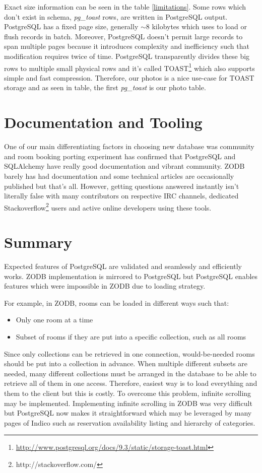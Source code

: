 Exact size information can be seen in the table \ref{limitations}. Some rows which don't exist in schema, \textit{pg\_toast} rows, are written in PostgreSQL output. PostgreSQL has a fixed page size, generally $\sim$8 kilobytes which uses to load or flush records in batch. Moreover, PostgreSQL doesn't permit large records to span multiple pages because it introduces complexity and inefficiency such that modification requires twice of time. PostgreSQL transparently divides these big rows to multiple small physical rows and it's called TOAST\footnote{\url{http://www.postgresql.org/docs/9.3/static/storage-toast.html}} which also supports simple and fast compression. Therefore, our photos is a nice use-case for TOAST storage and as seen in table, the first \textit{pg\_toast} is our photo table.

\section{Documentation and Tooling}

One of our main differentiating factors in choosing new database was community and room booking porting experiment has confirmed that PostgreSQL and SQLAlchemy have really good documentation and vibrant community. ZODB barely has had documentation and some technical articles are occasionally published but that's all. However, getting questions answered instantly isn't literally false with many contributors on respective IRC channels, dedicated Stackoverflow\footnote{http://stackoverflow.com/} users and active online developers using these tools.

\section{Summary}

Expected features of PostgreSQL are validated and seamlessly and efficiently works. ZODB implementation is mirrored to PostgreSQL but PostgreSQL enables features which were impossible in ZODB due to loading strategy. 

For example, in ZODB, rooms can be loaded in different ways such that:
\begin{itemize}
  \item Only one room at a time
  \item Subset of rooms if they are put into a specific collection, such as all rooms
\end{itemize}

Since only collections can be retrieved in one connection, would-be-needed rooms should be put into a collection in advance. When multiple different subsets are needed, many different collections must be arranged in the database to be able to retrieve all of them in one access. Therefore, easiest way is to load everything and them to the client but this is costly. To overcome this problem, infinite scrolling may be implemented. Implementing infinite scrolling in ZODB was very difficult but PostgreSQL now makes it straightforward which may be leveraged by many pages of Indico such as reservation availability listing and hierarchy of categories.